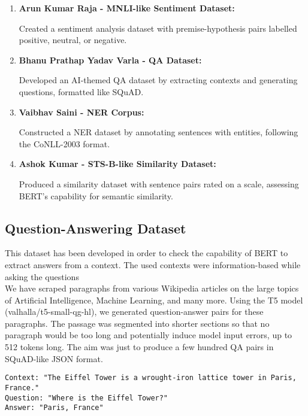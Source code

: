 ﻿\documentclass{article}
\begin{document}
\begin{enumerate}
    \item \textbf{Arun Kumar Raja - MNLI-like Sentiment Dataset:}
    \begin{itemize}
        {Created a sentiment analysis dataset with premise-hypothesis pairs labelled positive, neutral, or negative.}
    \end{itemize}

    \item \textbf{Bhanu Prathap Yadav Varla - QA Dataset:}
    \begin{itemize}
        {Developed an AI-themed QA dataset by extracting contexts and generating questions, formatted like SQuAD.}
    \end{itemize}

    \item \textbf{Vaibhav Saini - NER Corpus:}
    \begin{itemize}
        {Constructed a NER dataset by annotating sentences with entities, following the CoNLL-2003 format.}
    \end{itemize}

    \item \textbf{Ashok Kumar - STS-B-like Similarity Dataset:}
    \begin{itemize}
        {Produced a similarity dataset with sentence pairs rated on a scale, assessing BERT’s capability for semantic similarity.}
    \end{itemize}
\end{enumerate}

\subsection{Question-Answering Dataset}
This dataset has been developed in order to check the capability of BERT to extract answers from a context. The used contexts were information-based while asking the questions\\
We have scraped paragraphs from various Wikipedia articles on the large topics of Artificial Intelligence, Machine Learning, and many more.
Using the T5 model (valhalla/t5-small-qg-hl), we generated question-answer pairs for these paragraphs.
The passage was segmented into shorter sections so that no paragraph would be too long and potentially induce model input errors, up to 512 tokens long.
The aim was just to produce a few hundred QA pairs in SQuAD-like JSON format.
\begin{verbatim}
Context: "The Eiffel Tower is a wrought-iron lattice tower in Paris, France."
Question: "Where is the Eiffel Tower?"
Answer: "Paris, France"
\end{verbatim}
\end{document}
